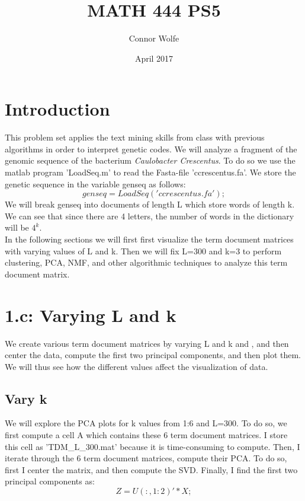 \documentclass{article}
\title{MATH 444 PS5}
\author{Connor Wolfe}
\date{April 2017}
\begin{document}
\maketitle

\section*{Introduction}
This problem set applies the text mining skills from class with previous algorithms in order to interpret genetic codes.  We will analyze a fragment of the genomic sequence of the bacterium \textit{Caulobacter Crescentus}.  To do so we use the matlab program 'LoadSeq.m' to read the Fasta-file 'ccrescentus.fa'.  We store the genetic sequence in the variable genseq as follows:
\begin{equation}
genseq=LoadSeq('ccrescentus.fa');
\end{equation}
We will break genseq into documents of length L which store words of length k.  We can see that since there are 4 letters, the number of words in the dictionary will be $4^k$. 
\\In the following sections we will first first visualize the term document matrices with varying values of L and k.  Then we will fix L=300 and k=3 to perform clustering, PCA, NMF, and other algorithmic techniques to analyze this term document matrix. 

\section*{1.c: Varying L and k}
We create various term document matrices by varying L and k and , and then center the data, compute the first two principal components, and then plot them.   We will thus see how the different values affect the visualization of data.

\subsection*{Vary k}
We will explore the PCA plots for k values from 1:6 and L=300.  To do so, we first compute a cell A which contains these 6 term document matrices.  I store this cell as 'TDM\_L\_300.mat' because it is time-consuming to compute.  Then, I iterate through the 6 term document matrices, compute their PCA.  To do so, first I center the matrix, and then compute the SVD.  Finally, I find the first two principal components as:
\begin{equation}
    Z=U(:,1:2)'*X;
\end{equation}
\end{document}
